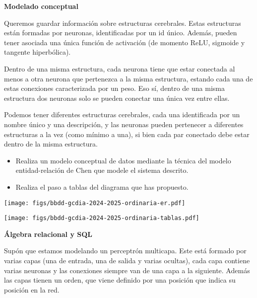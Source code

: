 \documentclass[
    12pt,
    a4paper,
    addpoints,
    answers,
    convocatoria=ord,
    titulacion=CD,
    curso=2024/2025,
]{db-exam}
\begin{document}
\begin{questions}

\question[3] \textbf{Modelado conceptual}

Queremos guardar información sobre estructuras cerebrales. Estas estructuras están formadas por neuronas, identificadas por un id único. Además, pueden tener asociada una única función de activación (de momento ReLU, sigmoide y tangente hiperbólica).

Dentro de una misma estructura, cada neurona tiene que estar conectada al menos a otra neurona que pertenezca a la misma estructura, estando cada una de estas conexiones caracterizada por un peso. Eso sí, dentro de una misma estructura dos neuronas solo se pueden conectar una única vez entre ellas.

Podemos tener diferentes estructuras cerebrales, cada una identificada por un nombre único y una descripción, y las neuronas pueden pertenecer a diferentes estructuras a la vez (como mínimo a una), si bien cada par conectado debe estar dentro de la misma estructura.

\begin{itemize}
    \item Realiza un modelo conceptual de datos mediante la técnica del modelo entidad-relación de Chen que modele el sistema descrito.
    \item Realiza el paso a tablas del diagrama que has propuesto.
\end{itemize}

\begin{solution}

\begin{center}
    \texttt{[image: figs/bbdd-gcdia-2024-2025-ordinaria-er.pdf]}
\end{center}

\begin{center}
    \texttt{[image: figs/bbdd-gcdia-2024-2025-ordinaria-tablas.pdf]}
\end{center}

\end{solution}

\question[5] \textbf{Álgebra relacional y SQL}

Supón que estamos modelando un perceptrón multicapa. Este está formado por varias capas (una de entrada, una de salida y varias ocultas), cada capa contiene varias neuronas y las conexiones siempre van de una capa a la siguiente. Además las capas tienen un orden, que viene definido por una posición que indica su posición en la red.


\end{questions}
\end{document}
